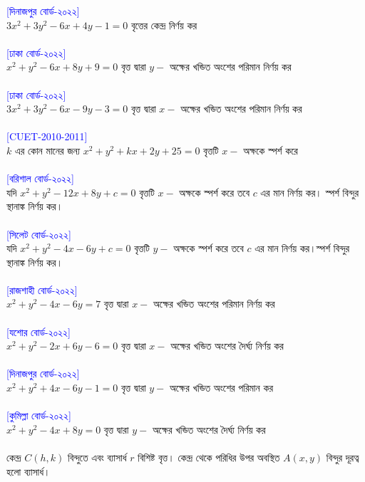 \documentclass{article}
\begin{document}
\textcolor{blue}{[দিনাজপুর বোর্ড-২০২২]}\\
$3x^2+3y^2-6x+4y-1=0$ বৃত্তের কেন্দ্র নির্ণয় কর \\ 
\\
\textcolor{blue}{[ঢাকা বোর্ড-২০২২]}\\
$x^2+y^2-6x+8y+9=0$ বৃত্ত দ্বারা $y-$  অক্ষের খন্ডিত অংশের পরিমান নির্ণয় কর \\ 
\\
\textcolor{blue}{[ঢাকা বোর্ড-২০২২]}\\
$3x^2+3y^2-6x-9y-3=0$ বৃত্ত দ্বারা $x-$  অক্ষের খন্ডিত অংশের পরিমান নির্ণয় কর \\ 
\\
\textcolor{blue}{[CUET-2010-2011]}\\
$k$ এর কোন মানের জন্য  $x^2+y^2+kx+2y+25=0$ বৃত্তটি $x-$ অক্ষকে স্পর্শ করে \\ 
\\ 
\textcolor{blue}{[বরিশাল বোর্ড-২০২২]}\\
 যদি $x^2+y^2-12x+8y+c=0$ বৃত্তটি $x-$ অক্ষকে স্পর্শ করে তবে  $c$ এর মান নির্ণয় কর। স্পর্শ বিন্দুর স্থানাঙ্ক নির্ণয় কর। \\
 \\ 
 \textcolor{blue}{[সিলেট বোর্ড-২০২২]}\\
 যদি $x^2+y^2-4x-6y+c=0$ বৃত্তটি $y-$ অক্ষকে স্পর্শ করে তবে  $c$ এর মান নির্ণয় কর।স্পর্শ বিন্দুর স্থানাঙ্ক নির্ণয় কর। \\
 \\ 
 \textcolor{blue}{[রাজশাহী বোর্ড-২০২২]}\\
 $x^2+y^2-4x-6y=7$ বৃত্ত দ্বারা $x-$  অক্ষের খন্ডিত অংশের পরিমান নির্ণয়  কর \\ 
 \\
 \textcolor{blue}{[যশোর বোর্ড-২০২২]}\\
 $x^2+y^2-2x+6y-6=0$ বৃত্ত দ্বারা $x-$  অক্ষের খন্ডিত অংশের দৈর্ঘ্য নির্ণয়  কর \\ 
 \\
 \textcolor{blue}{[দিনাজপুর বোর্ড-২০২২]}\\
 $x^2+y^2+4x-6y-1=0$ বৃত্ত দ্বারা $y-$  অক্ষের খন্ডিত অংশের পরিমান  কর \\ 
 \\
  \textcolor{blue}{[কুমিল্লা বোর্ড-২০২২]}\\
 $x^2+y^2-4x+8y=0$ বৃত্ত দ্বারা $y-$  অক্ষের খন্ডিত অংশের দৈর্ঘ্য নির্ণয়  কর \\ 
 \\
	কেন্দ্র  $C(h,k)$ বিন্দুতে এবং ব্যাসার্ধ $r$ বিশিষ্ট বৃত্ত। কেন্দ্র থেকে পরিধির উপর অবস্থিত $A(x,y)$ বিন্দুর দূরত্ব হলো ব্যাসার্ধ। \\ 
\end{document}
